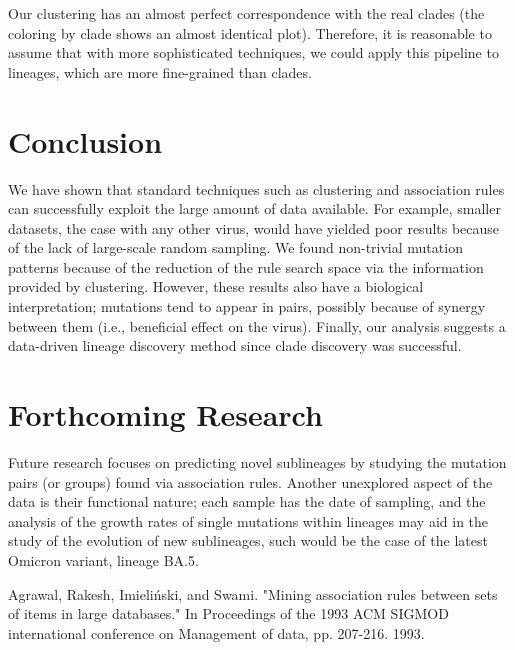 \documentclass[a0,landscape]{a0poster}
\begin{document}
\begin{multicols}{4}
Our clustering has an almost perfect correspondence with the real clades (the coloring by clade shows an almost identical plot). Therefore, it is reasonable to assume that with more sophisticated techniques, we could apply this pipeline to lineages, which are more fine-grained than clades.

\section*{Conclusion}


We have shown that standard techniques such as clustering and association rules can successfully exploit the large amount of data available. For example, smaller datasets, the case with any other virus, would have yielded poor results because of the lack of large-scale random sampling. We found non-trivial mutation patterns because of the reduction of the rule search space via the information provided by clustering. However, these results also have a biological interpretation; mutations tend to appear in pairs, possibly because of synergy between them (i.e., beneficial effect on the virus). Finally, our analysis suggests a data-driven lineage discovery method since clade discovery was successful.

\section*{Forthcoming Research}

Future research focuses on predicting novel sublineages by studying the mutation pairs (or groups) found via association rules. Another unexplored aspect of the data is their functional nature; each sample has the date of sampling, and the analysis of the growth rates of single mutations within lineages may aid in the study of the evolution of new sublineages, such would be the case of the latest Omicron variant, lineage BA.5.
	\begin{thebibliography}{99} 
	Agrawal, Rakesh, Imieliński, and Swami. "Mining association rules between sets of items in large databases." In Proceedings of the 1993 ACM SIGMOD international conference on Management of data, pp. 207-216. 1993.

\end{thebibliography}
\end{multicols}
\end{document}
